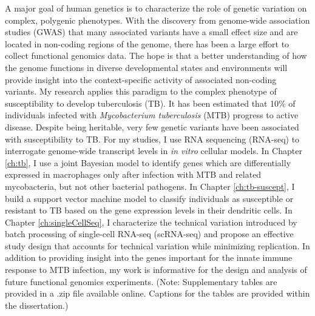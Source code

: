 \abstract
A major goal of human genetics is to characterize the role of genetic
variation on complex, polygenic phenotypes. With the discovery from
genome-wide association studies (GWAS) that many associated variants
have a small effect size and are located in non-coding regions of the
genome, there has been a large effort to collect functional genomics
data. The hope is that a better understanding of how the genome
functions in diverse developmental states and environments will
provide insight into the context-specific activity of associated
non-coding variants. My research applies this paradigm to the complex
phenotype of susceptibility to develop tuberculosis (TB). It has been
estimated that 10\% of individuals infected with \emph{Mycobacterium
tuberculosis} (MTB) progress to active disease. Despite being
heritable, very few genetic variants have been associated with
susceptibility to TB. For my studies, I use RNA sequencing (RNA-seq)
to interrogate genome-wide transcript levels in \emph{in vitro}
cellular models. In Chapter \ref{ch:tb}, I use a joint Bayesian model
to identify genes which are differentially expressed in macrophages
only after infection with MTB and related mycobacteria, but not other
bacterial pathogens. In Chapter \ref{ch:tb-suscept}, I build a support
vector machine model to classify individuals as susceptible or
resistant to TB based on the gene expression levels in their dendritic
cells. In Chapter \ref{ch:singleCellSeq}, I characterize the technical
variation introduced by batch processing of single-cell RNA-seq
(scRNA-seq) and propose an effective study design that accounts for
technical variation while minimizing replication.  In addition to
providing insight into the genes important for the innate immune
response to MTB infection, my work is informative for the design and
analysis of future functional genomics experiments.  (Note:
Supplementary tables are provided in a .zip file available
online. Captions for the tables are provided within the dissertation.)
